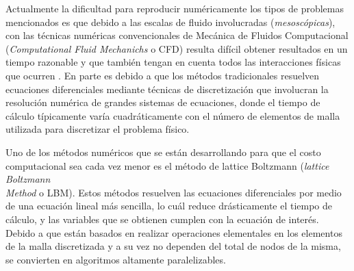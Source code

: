 
%
%

Actualmente la dificultad para reproducir numéricamente los tipos de problemas mencionados es que debido a las escalas de fluido involucradas (\textit{mesoscópicas}), con las técnicas numéricas convencionales de Mecánica de Fluidos Computacional (\textit{Computational Fluid Mechanichs} o CFD) resulta difícil obtener resultados en un tiempo razonable y que también tengan en cuenta todos las interacciones físicas que ocurren \cite{guo2013lattice}. En parte es debido a que los métodos tradicionales resuelven ecuaciones diferenciales mediante técnicas de discretización que involucran la resolución numérica de grandes sistemas de ecuaciones, donde el tiempo de cálculo típicamente varía cuadráticamente con el número de elementos de malla utilizada para discretizar el problema físico.

Uno de los métodos numéricos que se están desarrollando para que el costo computacional sea cada vez menor es el método de lattice Boltzmann (\textit{lattice Boltzmann \\
Method} o LBM). Estos métodos resuelven las ecuaciones diferenciales por medio de una ecuación lineal más sencilla, lo cuál reduce drásticamente el tiempo de cálculo, y las variables que se obtienen cumplen con la ecuación de interés. Debido a que están basados en realizar operaciones elementales en los elementos de la malla discretizada y a su vez no dependen del total de nodos de la misma, se convierten en algoritmos altamente paralelizables.

